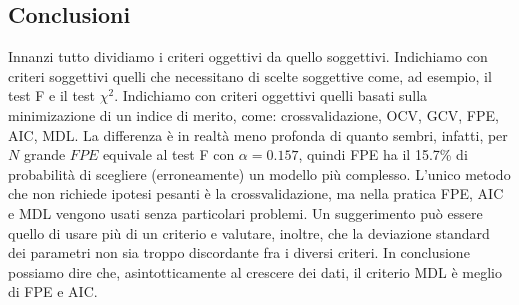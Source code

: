 \subsection{Conclusioni}
Innanzi tutto dividiamo i criteri oggettivi da quello soggettivi. Indichiamo con criteri soggettivi quelli che necessitano di scelte soggettive come, ad esempio, il test F e il test $\chi^2$. Indichiamo con criteri oggettivi quelli basati sulla minimizazione di un indice di merito, come: crossvalidazione, OCV, GCV, FPE, AIC, MDL. La differenza è in realtà meno profonda di quanto sembri, infatti, per $N$ grande $FPE$ equivale al test F con $\alpha=0.157$, quindi FPE ha il 15.7\% di probabilità di scegliere (erroneamente) un modello più complesso.
L'unico metodo che non richiede ipotesi pesanti è la crossvalidazione, ma nella pratica FPE, AIC e MDL vengono usati senza particolari problemi.
Un suggerimento può essere quello di usare più di un criterio e valutare, inoltre, che la deviazione standard dei parametri non sia troppo discordante fra i diversi criteri.
In conclusione possiamo dire che, asintotticamente al crescere dei dati, il criterio MDL è meglio di FPE e AIC.
